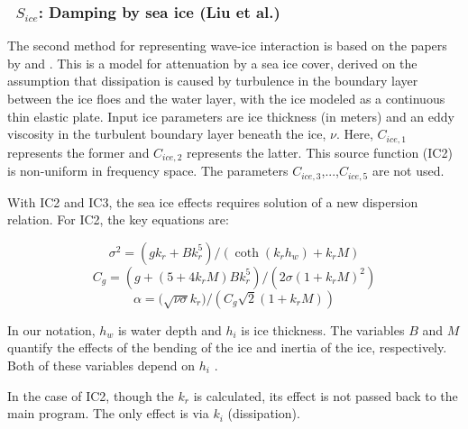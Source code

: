 \vsssub
\subsubsection{~$S_{ice}$: Damping by sea ice (Liu et al.)} \label{sec:ICE2}
\vsssub


\noindent
The second method for representing wave-ice interaction is based on the papers
by \cite{art:LMC88} and \cite{art:LHV91}. This is a model for attenuation by a
sea ice cover, derived on the assumption that dissipation is caused by
turbulence in the boundary layer between the ice floes and the water layer,
with the ice modeled as a continuous thin elastic plate. Input ice parameters
are ice thickness (in meters) and an eddy viscosity in the turbulent boundary
layer beneath the ice, ${\nu}$. Here, ${C_{ice,1}}$ represents the former and
${C_{ice,2}}$ represents the latter. This source function ({\code IC2}) is
non-uniform in frequency space. The parameters ${C_{ice,3}}$,...,${C_{ice,5}}$
are not used.

With {\code IC2} and {\code IC3}, the sea ice effects requires solution of a
new dispersion relation. For {\code IC2}, the key equations are:

\begin{equation}\label{eq:ice1}
  {\sigma}^2 = ({gk_r} + {Bk_r^5})/(\coth({k_r}{h_w}) + {k_r}{M})
\end{equation}
\begin{equation}\label{eq:ice2}
  {C_g} = (g + (5 + 4{k_r}{M}){B}{k_r^5})/(2{\sigma}(1+{k_r}{M})^2)
\end{equation}
\begin{equation}\label{eq:ice3}
  {\alpha} = (\sqrt{{\nu\sigma}}{k_r)}/({C_g}\sqrt{2}(1+{k_r}{M}))
\end{equation}

\noindent
In our notation, $h_w$ is water depth and $h_i$ is ice thickness.  The
variables $B$ and $M$ quantify the effects of the bending of the ice and
inertia of the ice, respectively. Both of these variables depend on $h_i$ 
\citep[see][]{art:LMC88, art:LHV91}.

\vspace{\baselineskip} \noindent
In the case of {\code IC2}, though the ${k_r}$ is calculated, its effect is
not passed back to the main program. The only effect is via ${k_i}$
(dissipation).

